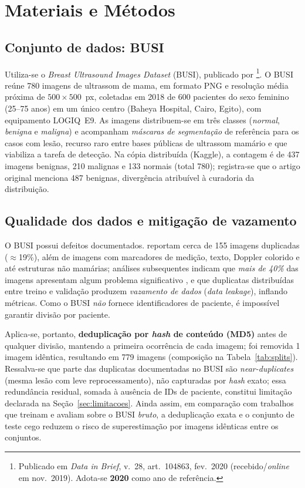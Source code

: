 \documentclass[11pt,a4paper]{article}
\begin{document}
\section{Materiais e Métodos}\label{sec:metodos}

\subsection{Conjunto de dados: BUSI}
Utiliza-se o \textit{Breast Ultrasound Images Dataset} (BUSI), publicado por
\citet{aldhabyani2020}\footnote{Publicado em \textit{Data in Brief}, v.~28,
art.~104863, fev.~2020 (recebido/\textit{online} em nov.~2019). Adota-se
\textbf{2020} como ano de referência.}. O BUSI reúne 780 imagens de ultrassom de
mama, em formato PNG e resolução média próxima de $500\times500$~px, coletadas em
2018 de 600 pacientes do sexo feminino (25--75 anos) em um único centro (Baheya
Hospital, Cairo, Egito), com equipamento LOGIQ~E9. As imagens distribuem-se em
três classes (\textit{normal}, \textit{benigna} e \textit{maligna}) e
acompanham \emph{máscaras de segmentação} de referência para os casos com lesão,
recurso raro entre bases públicas de ultrassom mamário e que viabiliza a tarefa
de detecção. Na cópia distribuída (Kaggle), a contagem é de 437 imagens benignas,
210 malignas e 133 normais (total 780); registra-se que o artigo original menciona
487 benignas, divergência atribuível à curadoria da distribuição.

\subsection{Qualidade dos dados e mitigação de vazamento}
O BUSI possui defeitos documentados. \citet{pawlowska2023} reportam cerca de 155
imagens duplicadas ($\approx$19\%), além de imagens com marcadores de medição,
texto, Doppler colorido e até estruturas não mamárias; análises subsequentes
indicam que \emph{mais de 40\%} das imagens apresentam algum problema
significativo \citep{pawlowska2024}, e que duplicatas distribuídas entre treino e
validação produzem \emph{vazamento de dados} (\textit{data leakage}), inflando
métricas. Como o BUSI \emph{não} fornece identificadores de paciente, é impossível
garantir divisão por paciente.

Aplica-se, portanto, \textbf{deduplicação por \textit{hash} de conteúdo (MD5)}
antes de qualquer divisão, mantendo a primeira ocorrência de cada imagem; foi
removida 1 imagem idêntica, resultando em 779 imagens (composição na
Tabela~\ref{tab:splits}). Ressalva-se que parte das duplicatas documentadas no
BUSI são \emph{near-duplicates} (mesma lesão com leve reprocessamento), não
capturadas por \textit{hash} exato; essa redundância residual, somada à ausência
de IDs de paciente, constitui limitação declarada na Seção~\ref{sec:limitacoes}.
Ainda assim, em comparação com trabalhos que treinam e avaliam sobre o BUSI
\emph{bruto}, a deduplicação exata e o conjunto de teste cego reduzem o risco de
superestimação por imagens idênticas entre os conjuntos.
\end{document}
